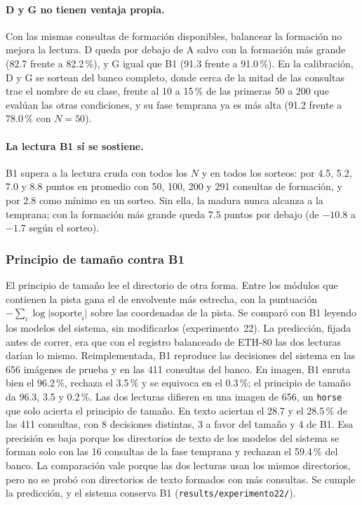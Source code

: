 \paragraph{D y G no tienen ventaja propia.}
Con las mismas consultas de formación disponibles, balancear la formación no mejora la
lectura.
D queda por debajo de A salvo con la formación más grande (82.7 frente a 82.2\,\%), y G
igual que B1 (91.3 frente a 91.0\,\%).
En la calibración, D y G se sortean del banco completo, donde cerca de la mitad de las
consultas trae el nombre de su clase, frente al 10 a 15\,\% de las primeras 50 a 200 que
evalúan las otras condiciones, y su fase temprana ya es más alta (91.2 frente a
78.0\,\% con $N = 50$).

\paragraph{La lectura B1 sí se sostiene.}
B1 supera a la lectura cruda con todos los $N$ y en todos los sorteos: por 4.5, 5.2, 7.0
y 8.8 puntos en promedio con 50, 100, 200 y 291 consultas de formación, y por 2.8 como
mínimo en un sorteo.
Sin ella, la madura nunca alcanza a la temprana; con la formación más grande queda 7.5
puntos por debajo (de $-10.8$ a $-1.7$ según el sorteo).

\subsubsection{Principio de tamaño contra B1}
\label{sec:fase2-tamano}

El principio de tamaño lee el directorio de otra forma.
Entre los módulos que contienen la pista gana el de envolvente más estrecha, con la
puntuación $-\sum_i \log \lvert \mathrm{soporte}_i \rvert$ sobre las coordenadas de la
pista.
Se comparó con B1 leyendo los modelos del sistema, sin modificarlos (experimento~22).
La predicción, fijada antes de correr, era que con el registro balanceado de ETH-80 las
dos lecturas darían lo mismo.
Reimplementada, B1 reproduce las decisiones del sistema en las 656 imágenes de
prueba y en las 411 consultas del banco.
En imagen, B1 enruta bien el 96.2\,\%, rechaza el 3.5\,\% y se equivoca en el 0.3\,\%;
el principio de tamaño da 96.3, 3.5 y 0.2\,\%.
Las dos lecturas difieren en una imagen de 656, un \texttt{horse} que solo acierta el
principio de tamaño.
En texto aciertan el 28.7 y el 28.5\,\% de las 411 consultas, con 8 decisiones
distintas, 3 a favor del tamaño y 4 de B1.
Esa precisión es baja porque los directorios de texto de los modelos del sistema se
forman solo con las 16 consultas de la fase temprana y rechazan el 59.4\,\% del banco.
La comparación vale porque las dos lecturas usan los mismos directorios, pero no se
probó con directorios de texto formados con más consultas.
Se cumple la predicción, y el sistema conserva B1
(\texttt{results/experimento22/}).

